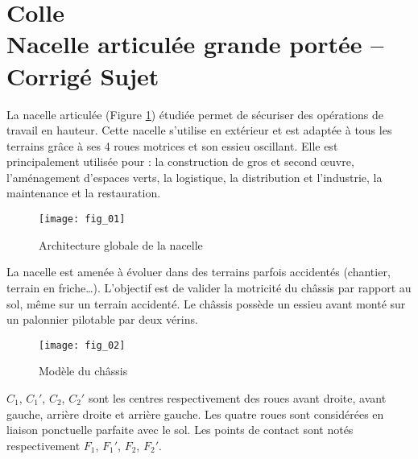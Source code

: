 \chapter*{Colle  \\ 
Nacelle articulée grande portée -- 
\ifprof Corrigé \else Sujet \fi}

\iflivret {} \else
\ifprof  {} \else \fi
\fi

\setcounter{question}{0}






\ifprof
\else
La nacelle articulée (Figure \ref{fig_01}) étudiée permet de sécuriser des opérations de travail en hauteur. 
Cette nacelle s’utilise en extérieur et est adaptée à tous les terrains grâce à ses 4 roues motrices 
et son essieu oscillant. Elle est principalement utilisée pour : la construction de gros et second 
œuvre, l’aménagement d’espaces verts, la logistique, la distribution et l’industrie, la maintenance 
et la restauration. 

\begin{figure}[H]
\centering
\texttt{[image: fig\_01]}
\caption{Architecture globale de la nacelle \label{fig_01}}
\end{figure}

La nacelle est amenée à évoluer dans des terrains parfois accidentés (chantier, terrain en friche…).
L’objectif est de valider la motricité du châssis par rapport au sol, même sur un terrain accidenté. 
Le châssis possède un essieu avant monté sur un palonnier pilotable par deux vérins. 

\begin{figure}[H]
\centering
\texttt{[image: fig\_02]}
\caption{Modèle du châssis \label{fig_02}}
\end{figure}


$C_1$, $C_1'$, $C_2$, $C_2'$ sont les centres respectivement des roues avant droite, avant gauche, arrière droite 
et arrière gauche. Les quatre roues sont considérées en liaison ponctuelle parfaite avec le sol. Les 
points de contact sont notés respectivement $F_1$, $F_1'$, $F_2$, $F_2'$. 
\fi


